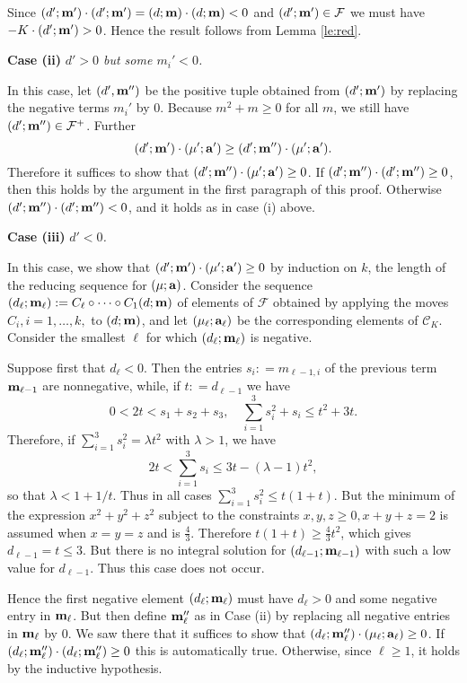 \documentclass[11pt]{amsart}
\newcommand{\1}{{{\mathchoice {\rm 1\mskip-4mu l} {\rm 1\mskip-4mu l}
{\rm 1\mskip-4.5mu l} {\rm 1\mskip-5mu l}}}}
\newcommand{\ba} {{\bf a}}
\newcommand{\bm} {{\bf m}}
\newcommand{\la}{{\lambda}}
\newcommand{\Cc}{{\mathcal C}}
\newcommand{\Ff}{{\mathcal F}}
\numberwithin{figure}{section}
\numberwithin{equation}{section}
\newcommand{\MS}{{\medskip}}
\newcommand{\NI}{{\noindent}}
\begin{document}
   Since $(d';\bm')\cdot (d';\bm') =(d;\bm)\cdot (d;\bm) < 0$ and $(d';\bm')\in \Ff$ we must have   $-K\cdot (d';\bm')  > 0$.      Hence the result follows from Lemma \ref{le:red}.
 
\MS

 \NI {\bf Case (ii)}   {\it $d'>0$ but some $m_i'<0$. }
 
 In this case, let $(d',\bm'')$ be the positive tuple obtained from $(d';\bm')$ by 
 replacing the negative terms $m_i'$ by $0$.  Because $m^2 + m \ge 0$ for all $m$, 
 we still have $(d';\bm'')\in \Ff^+$.  Further
 $$
  (d';\bm')\cdot (\mu';\ba') \ge 
 (d';\bm'')\cdot (\mu';\ba').
 $$
 Therefore it suffices to show that $(d';\bm'')\cdot (\mu';\ba')\ge 0$.
 If  $(d';\bm'')\cdot (d';\bm'')\ge 0$, then  this holds
 by the argument in the first paragraph of this proof.  
 Otherwise $(d';\bm'')\cdot (d';\bm'')< 0$, and  it holds
as in case (i) above. 
   \MS
   
\NI {\bf Case (iii)}   {\it $d'<0$. }

In this case, we show that $  (d';\bm')\cdot (\mu';\ba') \ge 0$ by induction on $k$, the length of the reducing sequence for $(\mu;\ba)$.
Consider the sequence $(d_\ell;\bm_\ell): = C_{\ell}\circ\dots \circ C_1(d;\bm)$ of elements of $\Ff$ obtained by applying the moves $C_i, i=1,\dots,k,$ to $(d;\bm)$, and let $(\mu_\ell;\ba_\ell)$  be the corresponding elements of $\Cc_K$.
Consider the smallest $\ell$ for which $(d_\ell;\bm_\ell) $ is negative.

Suppose first that $d_\ell < 0$.  Then the entries $s_i: = m_{\ell-1,i}$ of the previous term $\bm_{\ell-1}$ are nonnegative, while, if $t: = d_{\ell-1}$ we have 
$$
0< 2t<s_1+s_2+s_3,\quad \sum_{i=1}^3 s_i^2+s_i \le t^2 + 3t.
$$
Therefore, if $\sum_{i=1}^3  s_i^2= \la t^2$ with $\la > 1$,
we have
$$
2t < \sum_{i=1}^3  s_i \le 3t - (\la-1) t^2,
$$
so that $\la < 1 + 1/t$.  Thus in all cases
$\sum_{i=1}^3  s_i^2 \le t(1+t)$.
But  the minimum of the expression $x^2+y^2+z^2$ subject to the constraints $x,y,z\ge 0, x+y+z=2$ is assumed when $x=y=z$ and is $\frac 43$. Therefore $t(1+t) \ge \frac 43 t^2$, which gives $d_{\ell-1} = t\le 3$.  But there is no integral solution for 
$(d_{\ell-1};\bm_{\ell-1})$ with such a low value 
for $d_{\ell-1}$.  Thus this case does not occur.

 

Hence the first negative element $(d_\ell;\bm_\ell)$ must have $d_\ell>0$ and some negative entry in $\bm_\ell$.  
But then  define $\bm_\ell''$ as in Case (ii) by replacing all 
negative entries in $\bm_\ell$ by $0$.  We saw there that it suffices to show that 
 $(d_\ell;\bm_\ell'')\cdot (\mu_\ell;\ba_\ell) \ge 0$. 
 If  $(d_\ell;\bm_\ell'')\cdot(d_\ell;\bm_\ell'')\ge 0$ this is automatically true.  
Otherwise, since $\ell\ge 1$, it holds by the inductive hypothesis. 
\end{document}
